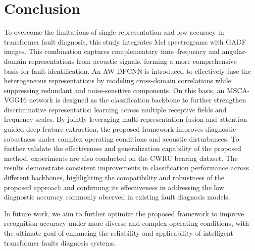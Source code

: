 \documentclass[anonymous]{iopjournal}
\begin{document}
\section{Conclusion}
\label{section6}
To overcome the limitations of single-representation and low accuracy in transformer fault diagnosis, this study integrates Mel spectrograms with GADF images. This combination captures complementary time–frequency and angular-domain representations from acoustic signals, forming a more comprehensive basis for fault identification. An AW-DPCNN is introduced to effectively fuse the heterogeneous representations by modeling cross-domain correlations while suppressing redundant and noise-sensitive components. On this basis, an MSCA-VGG16 network is designed as the classification backbone to further strengthen discriminative representation learning across multiple receptive fields and frequency scales. By jointly leveraging multi-representation fusion and attention-guided deep feature extraction, the proposed framework improves diagnostic robustness under complex operating conditions and acoustic disturbances. To further validate the effectiveness and generalization capability of the proposed method, experiments are also conducted on the CWRU bearing dataset. The results demonstrate consistent improvements in classification performance across different backbones, highlighting the compatibility and robustness of the proposed approach and confirming its effectiveness in addressing the low diagnostic accuracy commonly observed in existing fault diagnosis models.

In future work, we aim to further optimize the proposed framework to improve recognition accuracy under more diverse and complex operating conditions, with the ultimate goal of enhancing the reliability and applicability of intelligent transformer faults diagnosis systems.




\end{document}
